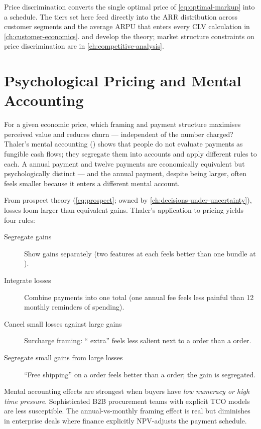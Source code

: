 Price discrimination converts the single optimal price of \cref{eq:optimal-markup} into a schedule. The tiers set here feed directly into the ARR distribution across customer segments and the average ARPU that enters every CLV calculation in \cref{ch:customer-economics}. \textcite{nagle2023strategy} and \textcite{pindyck2017} develop the theory; market structure constraints on price discrimination are in \cref{ch:competitive-analysis}.

\section{Psychological Pricing and Mental Accounting}\label{sec:psych-pricing}

For a given economic price, which framing and payment structure maximises perceived value and reduces churn --- independent of the number charged? Thaler's mental accounting (\textcite{thaler1985mental}) shows that people do not evaluate payments as fungible cash flows; they segregate them into accounts and apply different rules to each. A  annual payment and twelve  payments are economically equivalent but psychologically distinct --- and the annual payment, despite being larger, often feels smaller because it enters a different mental account.

From prospect theory (\cref{eq:prospect}; owned by \cref{ch:decisions-under-uncertainty}), losses loom larger than equivalent gains. Thaler's application to pricing yields four rules:

\begin{description}
  \item[Segregate gains] Show gains separately (two features at  each feels better than one bundle at ).
  \item[Integrate losses] Combine payments into one total (one annual fee feels less painful than 12 monthly reminders of spending).
  \item[Cancel small losses against large gains] Surcharge framing: `` extra'' feels less salient next to a  order than a  order.
  \item[Segregate small gains from large losses] ``Free shipping'' on a  order feels better than a  order; the gain is segregated.
\end{description}

Mental accounting effects are strongest when buyers have \emph{low numeracy or high time pressure}. Sophisticated B2B procurement teams with explicit TCO models are less susceptible. The annual-vs-monthly framing effect is real but diminishes in enterprise deals where finance explicitly NPV-adjusts the payment schedule.

